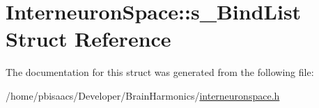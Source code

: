 \hypertarget{structInterneuronSpace_1_1s__BindList}{}\section{Interneuron\+Space\+:\+:s\+\_\+\+Bind\+List Struct Reference}
\label{structInterneuronSpace_1_1s__BindList}


The documentation for this struct was generated from the following file\+:\begin{DoxyCompactItemize}
\item 
/home/pbisaacs/\+Developer/\+Brain\+Harmonics/\mbox{\hyperlink{interneuronspace_8h}{interneuronspace.\+h}}\end{DoxyCompactItemize}
